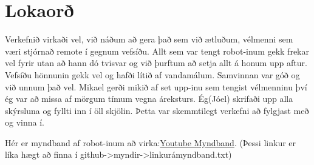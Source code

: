 \section{Lokaorð}
Verkefnið virkaði vel, við náðum að gera það sem við ætluðum, vélmenni sem væri stjórnað remote í gegnum vefsíðu. Allt sem var tengt robot-inum gekk frekar vel fyrir utan að hann dó tvisvar og við þurftum að setja allt á honum upp aftur. Vefsíðu hönnunin gekk vel og hafði lítið af vandamálum. Samvinnan var góð og við unnum það vel. Mikael gerði mikið af set upp-inu sem tengist vélmenninu því ég var að missa af mörgum tímum vegna áreksturs. Ég(Jóel) skrifaði upp alla skýrsluna og fyllti inn í öll skjölin. 
Þetta var skemmtilegt verkefni að fylgjast með og vinna í. 

Hér er myndband af robot-inum að virka:\href{https://www.youtube.com/watch?v=D2xLbNhgX38}{Youtube Myndband}.  (Þessi linkur er líka hægt að finna í github->myndir->linkurámyndband.txt)
